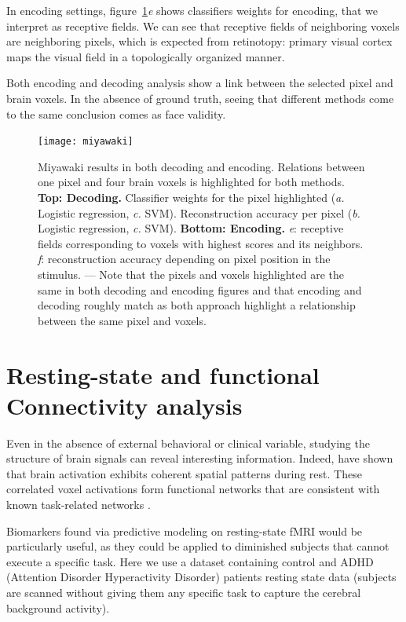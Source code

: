 \documentclass{frontiersSCNS} %
\begin{document}
In encoding settings, figure~\ref{fig:miyawaki}\textit{e} shows classifiers
weights for encoding, that we interpret as receptive fields. We can
see that receptive fields of neighboring voxels are neighboring
pixels, which is expected from retinotopy: primary visual
cortex maps the visual field in a topologically organized manner.

Both encoding and decoding analysis show a link between the selected
pixel and brain voxels. In the absence of ground truth, seeing that
different methods come to the same conclusion comes as face validity.


\begin{figure}[hbtp]
  \begin{center}
    \texttt{[image: miyawaki]}
  \end{center}
  \caption{
      Miyawaki results in both decoding and encoding. Relations between one
      pixel and four brain voxels is highlighted for both methods.
      \textbf{Top: Decoding.} Classifier weights for the pixel
      highlighted (\textit{a.} Logistic regression, \textit{c.} SVM).
      Reconstruction accuracy per pixel
      (\textit{b.} Logistic
      regression, \textit{c.} SVM). 
      \textbf{Bottom: Encoding.} \textit{e}: receptive fields corresponding to
       voxels with highest scores and its neighbors.
       \textit{f}: reconstruction accuracy depending on 
	  pixel position in the stimulus. --- Note that the pixels and voxels highlighted are the same in 
      both decoding and encoding figures and that encoding and decoding
      roughly match as both approach highlight a relationship between the
      same pixel and voxels.
}
\label{fig:miyawaki}
\end{figure}


\section{Resting-state and functional Connectivity analysis}

Even in the absence of external behavioral or clinical variable, studying
the structure of brain signals can reveal interesting information.
Indeed, \cite{biswal1995} have shown that brain activation exhibits
coherent spatial patterns during rest. These correlated voxel activations
form functional networks that are consistent with known task-related networks
\citep{smith2009}.

Biomarkers found via predictive modeling on resting-state fMRI would be
particularly useful, as they could be applied to diminished subjects that
cannot execute a specific task. Here we use a dataset containing control
and ADHD (Attention Disorder Hyperactivity Disorder) patients resting
state data (subjects are scanned without giving them any specific task to
capture the cerebral background activity).
\end{document}
